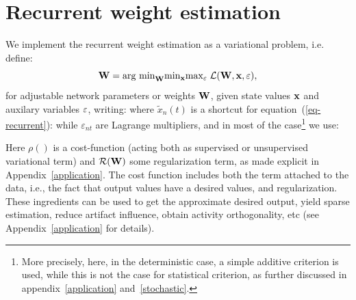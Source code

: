 \section{Recurrent weight estimation}

We implement the recurrent weight estimation as a variational problem, i.e. define: \begin{equation}\label{eq-criterion} {\bf W} = \mbox{arg min}_{{\bf W}} \mbox{min}_{\bf x} \mbox{max}_{\bf \varepsilon} \; {\cal L}({\bf W} , {\bf x}, {\bf \varepsilon}) ,\end{equation}
for adjustable network parameters or weights ${\bf W}$, given state values ${\bf x}$ and auxilary variables ${\bf \varepsilon}$, writing:
where $\tilde{x}_n(t)$ is a shortcut for equation~(\ref{eq-recurrent}):
while $\varepsilon_{nt}$ are Lagrange multipliers, and in most of the case\footnote{More precisely, here, in the deterministic case, a simple additive criterion is used, while this is not the case for statistical criterion, as further discussed in appendix~\ref{application} and~\ref{stochastic}.} we use:

Here $\rho()$ is a cost-function (acting both as supervised or unsupervised variational term) and ${\cal R}({\bf W})$ some regularization term, as made explicit in Appendix~\ref{application}. The cost function includes both the term attached to the data, i.e., the fact that output values have a desired values, and regularization. These ingredients can be used to get the approximate desired output, yield sparse estimation, reduce artifact influence, obtain activity orthogonality, etc (see Appendix~\ref{application} for details).

